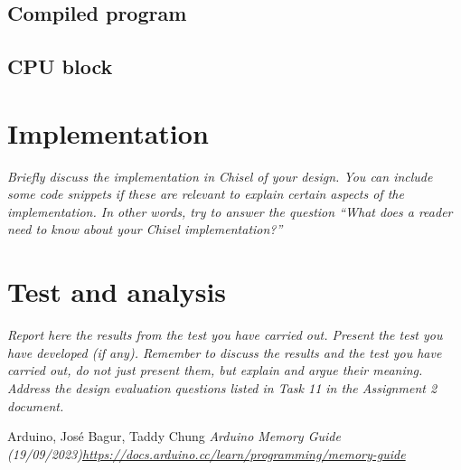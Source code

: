 \documentclass[a4paper, english]{article}
\numberwithin{equation}{section}
\begin{document}
\subsection{Compiled program}
\subsection{CPU block}
\section{Implementation}
\emph{Briefly discuss the implementation in Chisel of your design. You can include some code snippets if these are relevant to explain certain aspects of the implementation. In other words, try to answer the question “What does a reader need to know about your Chisel implementation?”}
\section{Test and analysis}
\emph{Report here the results from the test you have carried out. Present the test you have developed (if any). Remember to discuss the results and the test you have carried out, do not just present them, but explain and argue their meaning. Address the design evaluation questions listed in Task 11 in the Assignment 2 document.}
\begin{thebibliography}{1}
    Arduino, José Bagur, Taddy Chung \emph{Arduino Memory Guide (19/09/2023)\newline \href{https://docs.arduino.cc/learn/programming/memory-guide}{https://docs.arduino.cc/learn/programming/memory-guide}}
\end{thebibliography}

%
%




%
\end{document}
